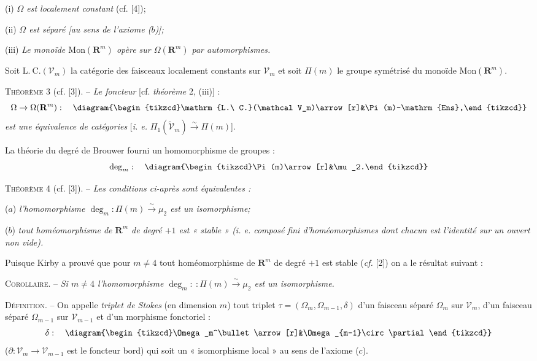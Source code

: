 (i) \textit{$\Omega$ est localement constant} (cf. [4]);

(ii) \textit{$\Omega$ est séparé [au sens de l'axiome ($b$)];}

(iii) \textit{Le monoïde $\mathrm{Mon}(\mathbf R^m)$ opère sur $\Omega(\mathbf R^m)$ par automorphismes.}

Soit $\mathrm{L.\ C.}(\mathcal V_m)$ la catégorie des faisceaux localement constants sur $\mathcal V_m$ et soit $\Pi(m)$ le groupe symétrisé du monoïde $\mathrm{Mon}(\mathbf R^m)$.

\textsc{Théorème} 3 (cf. [3]). -- \textit{Le foncteur} [cf. \textit{théorème} 2, (iii)] :
\[
\Omega\to\Omega(\mathbf R^m):\quad\diagram{\begin{tikzcd}\mathrm{L.\ C.}(\mathcal V_m)\arrow[r]&\Pi(m)-\mathrm{Ens},\end{tikzcd}}
\]
\textit{est une équivalence de catégories} [\textit{i. e.} $\Pi_1(\widetilde{\mathcal V}_m)\xrightarrow{\sim}\Pi(m)$].

La théorie du degré de Brouwer fourni un homomorphisme de groupes :
\[
\deg_m:\quad\diagram{\begin{tikzcd}\Pi(m)\arrow[r]&\mu_2.\end{tikzcd}}
\]

\textsc{Théorème} 4 (cf. [3]). -- \textit{Les conditions ci-après sont équivalentes :}

($a$) \textit{l'homomorphisme $\deg_m:\Pi(m)\xrightarrow{\sim}\mu_2$ est un isomorphisme;}

($b$) \textit{tout homéomorphisme de $\mathbf R^m$ de degré $+1$ est « stable » (i. e. composé fini d'homéomorphismes dont chacun est l'identité sur un ouvert non vide).}

Puisque Kirby a prouvé que pour $m\ne4$ tout homéomorphisme de $\mathbf R^m$ de degré $+1$ est stable (\textit{cf.} [2]) on a le résultat suivant :

\textsc{Corollaire}. -- \textit{Si $m\ne4$ l'homomorphisme $\deg_m:\ :\Pi(m)\xrightarrow{\sim}\mu_2$ est un isomorphisme.}

\textsc{Définition}. -- On appelle \textit{triplet de Stokes} (en dimension $m$) tout triplet $\tau=(\Omega_m,\Omega_{m-1},\delta)$ d'un faisceau séparé $\Omega_m$ sur $\mathcal V_m$, d'un faisceau séparé $\Omega_{m-1}$ sur $\mathcal V_{m-1}$ et d'un morphisme fonctoriel :
\[
\delta:\quad\diagram{\begin{tikzcd}\Omega_m^\bullet\arrow[r]&\Omega_{m-1}\circ\partial\end{tikzcd}}
\]
($\partial:\mathcal V_m\to\mathcal V_{m-1}$ est le foncteur bord) qui soit un « isomorphisme local » au sens de l'axiome ($c$).

